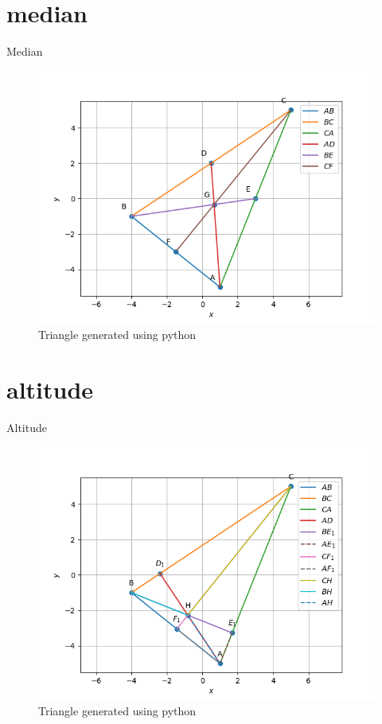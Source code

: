 \documentclass[journal,12pt,onecolumn]{IEEEtran}
\theoremstyle{remark}
\begin{document}
\begin{table}[!ht]
	\section{median}
	\centering
	
	\caption{Median}
	\label{table:median}
\end{table}

\begin{figure}
\includegraphics[width=\columnwidth]{./figs/Q1.2.2.png}
\caption{Triangle generated using python}
\label{fig:median}
\end{figure}

\begin{table}[!ht]
	\section{altitude}
	\centering
	
	\caption{Altitude}
	\label{table:Altitude}
\end{table}

\begin{figure}
\includegraphics[width=\columnwidth]{./figs/Q1.3.4.png}
\caption{Triangle generated using python}
\label{fig:altitude}
\end{figure}
\end{document}
